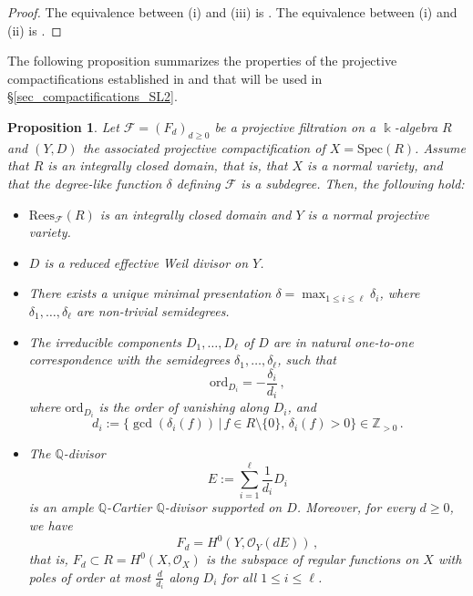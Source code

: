 \documentclass[12pt,letterpaper, reqno]{amsart}
\newtheorem{proposition}[theorem]{Proposition}
\theoremstyle{defstyle} \newtheorem{definition}[theorem]{Definition}
\theoremstyle{remark}
\numberwithin{equation}{section}
\numberwithin{figure}{section}
\newcommand{\cF} {\mathcal{F}}
\newcommand{\Spec} {\mathrm{Spec}}
\newcommand{\kk} {\Bbbk}
\newcommand{\cO} {\mathcal{O}}
\newcommand{\QQ} {\mathbb{Q}}
\newcommand{\ZZ} {\mathbb{Z}}
\begin{document}
\begin{proof}
The equivalence between (i) and (iii) is \cite[Theorem 4.1]{mondal2014projective}.
The equivalence between (i) and (ii) is
\cite[Corollary 4.2]{mondal2014projective}.
\end{proof}

The following proposition summarizes the properties of the projective compactifications established in 
\cite{mondal2014projective} and that will be used in \S\ref{sec_compactifications_SL2}.


\begin{proposition} \label{prop_proj_comp}
      Let $\cF=(F_d)_{d \geq 0}$ be a projective filtration on a $\kk$-algebra $R$ and $(Y,D)$ the associated projective compactification of $X=\Spec(R)$. Assume that $R$ is an integrally closed domain, that is, that $X$ is a normal variety, and that 
       the degree-like function  $\delta$ defining $\cF$ is a subdegree. Then, the following hold:
      \begin{itemize}
          \item[(i)] $\mathrm{Rees}_\cF(R)$ is an integrally closed domain and $Y$ is a normal projective variety.
          \item[(ii)] $D$ is a reduced effective Weil divisor on $Y$.
          \item[(iii)] There exists a unique minimal presentation $\delta=\max_{1 \leq i \leq \ell} \delta_i$, where $\delta_1, \dots, \delta_\ell$ are non-trivial semidegrees.
          \item[(iv)] The irreducible components $D_1, \dots, D_\ell$ of $D$ are in natural one-to-one correspondence with the semidegrees $\delta_1, \dots, \delta_\ell$, such that
          \[ \mathrm{ord}_{D_i}=-\frac{\delta_i}{d_i}\,,\]
          where $\mathrm{ord}_{D_i}$ is the order of vanishing along $D_i$, and 
          \begin{equation}
\label{eq:di}
    d_i:=\{\gcd(\delta_i(f)) \,|\, f \in R \setminus \{0\}, \,\delta_i(f)>0\} \in \ZZ_{>0}\,.
\end{equation}
          \item[(v)] The $\QQ$-divisor 
          \begin{equation}
\label{eq:edelta}
     E:=\sum_{i=1}^\ell \frac{1}{d_i}D_i
\end{equation} is an ample $\QQ$-Cartier $\QQ$-divisor supported on $D$. Moreover, for every $d \geq 0$, we have \[ F_d=H^0(Y, \cO_Y(d E))\,,\]
      that is, $F_d \subset R=H^0(X,\cO_X)$ is the subspace of regular functions on $X$ with 
      poles of order at most $\frac{d}{d_i}$ along $D_i$ for all $1 \leq i \leq {\ell}$.
      \end{itemize}
\end{proposition}
\end{document}
